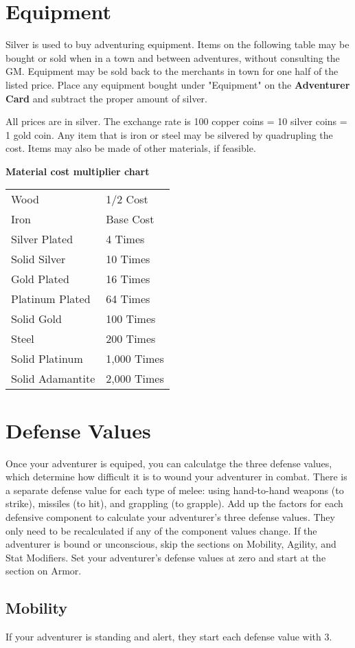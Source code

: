 \begin{multicols*}{2}
\section{Equipment}
Silver is used to buy adventuring equipment. Items on the following table may be bought or sold when in a town and between adventures, without consulting the GM. Equipment may be sold back to the merchants in town for one half of the listed price. Place any equipment bought under "Equipment" on the \textbf{Adventurer Card} and subtract the proper amount of silver.

All prices are in silver. The exchange rate is 100 copper coins = 10 silver coins = 1 gold coin. Any item that is iron or steel may be silvered by quadrupling the cost. Items may also be made of other materials, if feasible.

\textbf{Material cost multiplier chart}

\begin{tabular}{@{}l l}
Wood  & 1/2 Cost\\
Iron  & Base Cost\\
Silver Plated  & 4 Times\\
Solid Silver  & 10 Times\\
Gold Plated  & 16 Times\\
Platinum Plated  & 64 Times\\
Solid Gold  & 100 Times\\
Steel  & 200 Times\\
Solid Platinum  & 1,000 Times\\
Solid Adamantite  & 2,000 Times\\
\end{tabular}
\section{Defense Values}
Once your adventurer is equiped, you can calculatge the three defense values, which determine how difficult it is to wound your adventurer in combat. There is a separate defense value for each type of melee: using hand-to-hand weapons (to strike), missiles (to hit), and grappling (to grapple). Add up the factors for each defensive component to calculate your adventurer’s three defense values. They only need to be recalculated if any of the component values change.
If the adventurer is bound or unconscious, skip the sections on Mobility, Agility, and Stat Modifiers. Set your adventurer’s defense values at zero and start at the section on Armor.
\subsection{Mobility}
If your adventurer is standing and alert, they start each defense value with 3.

\end{multicols*}
